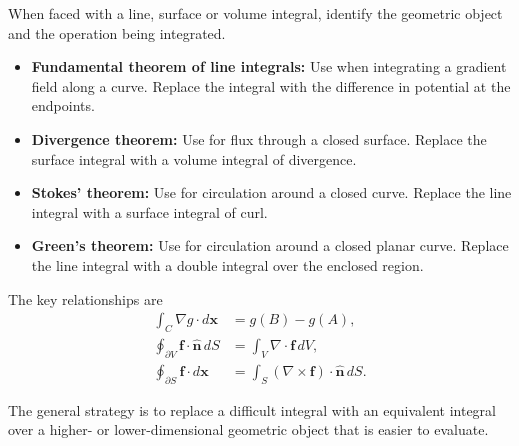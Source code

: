 \begin{method}
When faced with a line, surface or volume integral, identify the geometric object and the operation being integrated.

\begin{itemize}
    \item \textbf{Fundamental theorem of line integrals:} Use when integrating a gradient field along a curve. Replace the integral with the difference in potential at the endpoints.

    \item \textbf{Divergence theorem:} Use for flux through a closed surface. Replace the surface integral with a volume integral of divergence.

    \item \textbf{Stokes' theorem:} Use for circulation around a closed curve. Replace the line integral with a surface integral of curl.

    \item \textbf{Green's theorem:} Use for circulation around a closed planar curve. Replace the line integral with a double integral over the enclosed region.
\end{itemize}

The key relationships are
\[
\begin{aligned}
\int_C\nabla g\cdot d\boldsymbol x
&=g(B)-g(A),\\[4pt]
\oint_{\partial V}\boldsymbol f\cdot\hat{\boldsymbol n}\,dS
&=\int_V\nabla\cdot\boldsymbol f\,dV,\\[4pt]
\oint_{\partial S}\boldsymbol f\cdot d\boldsymbol x
&=\int_S(\nabla\times\boldsymbol f)
\cdot\hat{\boldsymbol n}\,dS.
\end{aligned}
\]

The general strategy is to replace a difficult integral with an equivalent integral over a higher- or lower-dimensional geometric object that is easier to evaluate.
\end{method}

